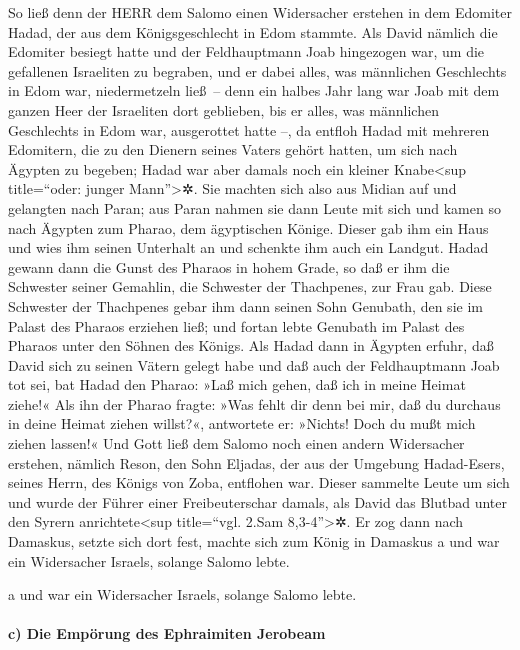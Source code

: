 So ließ denn der HERR dem Salomo einen Widersacher
erstehen in dem Edomiter Hadad, der aus dem Königsgeschlecht in Edom
stammte. Als David nämlich die Edomiter besiegt hatte und
der Feldhauptmann Joab hingezogen war, um die gefallenen Israeliten zu
begraben, und er dabei alles, was männlichen Geschlechts in Edom war,
niedermetzeln ließ~-- denn ein halbes Jahr lang war Joab
mit dem ganzen Heer der Israeliten dort geblieben, bis er alles, was
männlichen Geschlechts in Edom war, ausgerottet hatte --,
da entfloh Hadad mit mehreren Edomitern, die zu den
Dienern seines Vaters gehört hatten, um sich nach Ägypten zu begeben;
Hadad war aber damals noch ein kleiner Knabe\textless sup title=``oder:
junger Mann''\textgreater✲. Sie machten sich also aus
Midian auf und gelangten nach Paran; aus Paran nahmen sie dann Leute mit
sich und kamen so nach Ägypten zum Pharao, dem ägyptischen Könige.
Dieser gab ihm ein Haus und wies ihm seinen Unterhalt an und schenkte
ihm auch ein Landgut. Hadad gewann dann die Gunst des
Pharaos in hohem Grade, so daß er ihm die Schwester seiner Gemahlin, die
Schwester der Thachpenes, zur Frau gab. Diese Schwester
der Thachpenes gebar ihm dann seinen Sohn Genubath, den sie im Palast
des Pharaos erziehen ließ; und fortan lebte Genubath im Palast des
Pharaos unter den Söhnen des Königs. Als Hadad dann in
Ägypten erfuhr, daß David sich zu seinen Vätern gelegt habe und daß auch
der Feldhauptmann Joab tot sei, bat Hadad den Pharao: »Laß mich gehen,
daß ich in meine Heimat ziehe!« Als ihn der Pharao
fragte: »Was fehlt dir denn bei mir, daß du durchaus in deine Heimat
ziehen willst?«, antwortete er: »Nichts! Doch du mußt mich ziehen
lassen!« Und Gott ließ dem Salomo noch einen andern
Widersacher erstehen, nämlich Reson, den Sohn Eljadas, der aus der
Umgebung Hadad-Esers, seines Herrn, des Königs von Zoba, entflohen war.
Dieser sammelte Leute um sich und wurde der Führer einer
Freibeuterschar damals, als David das Blutbad unter den Syrern
anrichtete\textless sup title=``vgl. 2.Sam 8,3-4''\textgreater✲. Er zog
dann nach Damaskus, setzte sich dort fest, machte sich zum König in
Damaskus a und war ein Widersacher Israels, solange
Salomo lebte.

a und war ein Widersacher Israels, solange Salomo lebte.

\hypertarget{c-die-empuxf6rung-des-ephraimiten-jerobeam}{%
\paragraph{c) Die Empörung des Ephraimiten
Jerobeam}\label{c-die-empuxf6rung-des-ephraimiten-jerobeam}}

